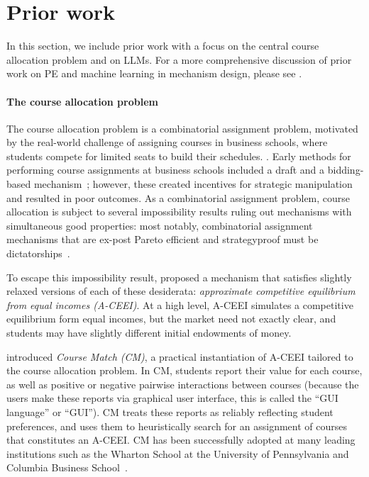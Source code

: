 \section{Prior work}
In this section, we include prior work with a focus on the central course allocation problem and on LLMs. For a more comprehensive discussion of prior work on PE and machine learning in mechanism design, please see .


\paragraph{The course allocation problem}
The course allocation problem is a combinatorial assignment problem, motivated by the real-world challenge of assigning courses in business schools, where students compete for limited seats to build their schedules.
\cite{budish2017course}.
Early methods for performing course assignments at business schools included a draft and a bidding-based mechanism~\cite{sonmez2010course,brams1979prisoners}; however, these created incentives for strategic manipulation and resulted in poor outcomes.
As a combinatorial assignment problem, course allocation is subject to several impossibility results ruling out mechanisms with simultaneous good properties: most notably, combinatorial assignment mechanisms that are ex-post Pareto efficient and strategyproof must be dictatorships~\cite{papai2001strategyproof,hatfield2009strategy}.

To escape this impossibility result, \citet{budish2011combinatorial} proposed a mechanism that satisfies slightly relaxed versions of each of these desiderata: \textit{approximate competitive equilibrium from equal incomes (A-CEEI)}.
At a high level, A-CEEI simulates a competitive equilibrium form equal incomes, but the market need not exactly clear, and students may have slightly different initial endowments of money.

\citet{budish2017course} introduced \textit{Course Match (CM)}, a practical instantiation of A-CEEI tailored to the course allocation problem.
In CM, students report their value for each course, as well as positive or negative pairwise interactions between courses (because the users make these reports via graphical user interface, this is called the ``GUI language'' or ``GUI'').
CM treats these reports as reliably reflecting student preferences, and uses them to heuristically search for an assignment of courses that constitutes an A-CEEI.
CM has been successfully adopted at many leading institutions such as the Wharton School at the University of Pennsylvania and Columbia Business School~\cite{Course,Coursea}.


